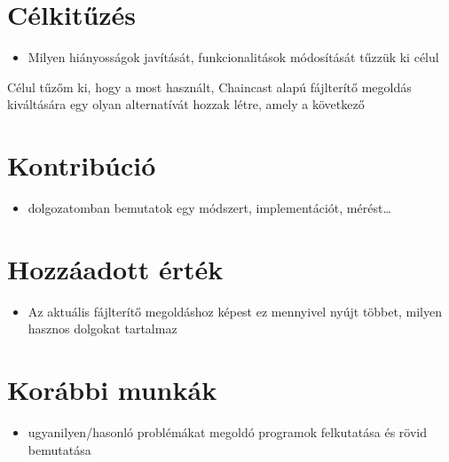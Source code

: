 \section{Célkitűzés}
\begin{itemize}
  \item Milyen hiányosságok javítását, funkcionalitások módosítását tűzzük ki célul
\end{itemize}
Célul tűzőm ki, hogy a most használt, Chaincast alapú fájlterítő megoldás kiváltására egy olyan alternatívát hozzak létre, amely a következő 


\section{Kontribúció}
\begin{itemize}
  \item dolgozatomban bemutatok egy módszert, implementációt, mérést\ldots
\end{itemize}

\section{Hozzáadott érték}
\begin{itemize}
  \item Az aktuális fájlterítő megoldáshoz képest ez mennyivel nyújt többet, milyen hasznos dolgokat tartalmaz
\end{itemize}

\section{Korábbi munkák}
\begin{itemize}
  \item ugyanilyen/hasonló problémákat megoldó programok felkutatása és rövid bemutatása
\end{itemize}
